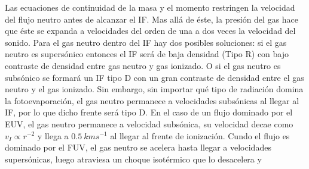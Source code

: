 Las ecuaciones de continuidad de la masa y el momento restringen la velocidad
del flujo neutro antes de alcanzar el IF. Mas allá de éste, la presión del
gas hace que éste se expanda a velocidades del orden de una a dos veces la
velocidad del sonido. Para el gas neutro dentro del IF hay dos posibles
soluciones: si el gas neutro es supersónico entonces el IF será de baja
densidad (Tipo R) con bajo contraste de densidad entre gas neutro y
gas ionizado. O si el gas neutro es subsónico se formará un IF tipo D con un
gran contraste de densidad entre el gas neutro y el gas ionizado. Sin embargo,
sin importar qué tipo de radiación domina la fotoevaporación, el gas neutro
permanece a velocidades subsónicas al llegar al IF, por lo que dicho frente
será tipo D. 
En el caso de un flujo dominado por el EUV, el gas neutro permanece a
velocidad subsónica, su velocidad decae como $v_I \propto r^{-2}$ y llega
a $0.5~kms^{-1}$ al llegar al frente de ionización. Cundo el flujo es
dominado por el FUV, el gas neutro se acelera hasta llegar a velocidades
supersónicas, luego atraviesa un choque isotérmico que lo desacelera y
